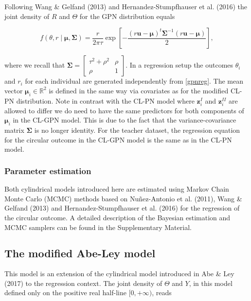 \documentclass[12pt,]{article}
\begin{document}
Following Wang \& Gelfand (2013) and Hernandez-Stumpfhauser et al.
(2016) the joint density of \(R\) and \(\Theta\) for the GPN
distribution equals

\begin{equation}\label{gpnreg}
f(\theta, r \mid \boldsymbol{\mu}, \boldsymbol{\Sigma}) = \frac{r}{2\pi\tau} \exp\left[ -\frac{(r\boldsymbol{u}-\boldsymbol{\mu})^{t}\boldsymbol{\Sigma}^{-1}(r\boldsymbol{u}-\boldsymbol{\mu})}{2}\right],
\end{equation}

\noindent where we recall that
\(\boldsymbol{\Sigma} = \begin{bmatrix} \tau^2 + \rho^2 & \rho\\ \rho & 1 \end{bmatrix}\).
In a regression setup the outcomes \(\theta_i\) and \(r_i\) for each
individual are generated independently from \eqref{gpnreg}. The mean
vector \(\boldsymbol{\mu}_i \in \mathbb{R}^2\) is defined in the same
way via covariates as for the modified CL-PN distribution. Note in
contrast with the CL-PN model where \(\boldsymbol{z}_i^I\) and
\(\boldsymbol{z}_i^{II}\) are allowed to differ we do need to have the
same predictors for both components of \(\boldsymbol{\mu}_i\) in the
CL-GPN model. This is due to the fact that the variance-covariance
matrix \(\boldsymbol{\Sigma}\) is no longer identity. For the teacher
dataset, the regression equation for the circular outcome in the CL-GPN
model is the same as in the CL-PN model.

\subsubsection{Parameter estimation}

Both cylindrical models introduced here are estimated using Markov Chain
Monte Carlo (MCMC) methods based on Nuñez-Antonio et al. (2011), Wang \&
Gelfand (2013) and Hernandez-Stumpfhauser et al. (2016) for the
regression of the circular outcome. A detailed description of the
Bayesian estimation and MCMC samplers can be found in the Supplementary
Material.

\subsection{The modified Abe-Ley model}\label{WeiSSVM}

This model is an extension of the cylindrical model introduced in Abe \&
Ley (2017) to the regression context. The joint density of \(\Theta\)
and \(Y\), in this model defined only on the positive real half-line
\([0, + \infty)\), reads
\end{document}
